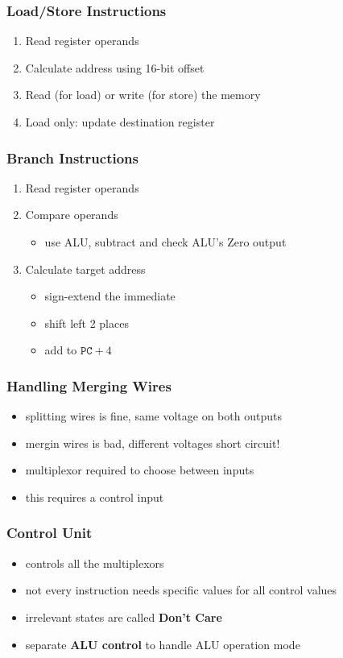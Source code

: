 \documentclass{article}
\begin{document}
\subsubsection{Load/Store Instructions}
\begin{enumerate}
	\item Read register operands
	\item Calculate address using 16-bit offset
	\item Read (for load) or write (for store) the memory
	\item Load only: update destination register
\end{enumerate}
\subsubsection{Branch Instructions}
\begin{enumerate}
	\item Read register operands
	\item Compare operands \begin{itemize}
		      \item use ALU, subtract and check ALU's Zero output
	      \end{itemize}
	\item Calculate target address \begin{itemize}
		      \item sign-extend the immediate
		      \item shift left 2 places
		      \item add to $\texttt{PC}+4$
	      \end{itemize}
\end{enumerate}
\subsubsection{Handling Merging Wires}
\begin{itemize}
	\item splitting wires is fine, same voltage on both outputs
	\item mergin wires is bad, different voltages \Rightarrow short circuit!
	\item multiplexor required to choose between inputs
	\item this requires a control input
\end{itemize}
\subsubsection{Control Unit}
\begin{itemize}
	\item controls all the multiplexors
	\item not every instruction needs specific values for all control values
	\item irrelevant states are called \textbf{Don't Care}
	\item separate \textbf{ALU control} to handle ALU operation mode
\end{itemize}
\end{document}
